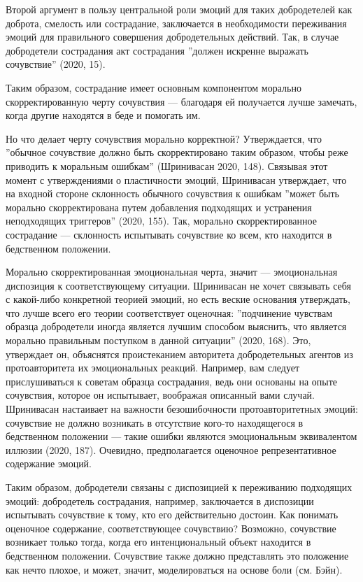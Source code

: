 \documentclass[11pt]{book}
\begin{document}
Второй аргумент в пользу центральной роли эмоций для таких добродетелей как доброта, смелость или сострадание, заключается в необходимости переживания эмоций для правильного совершения добродетельных действий. Так, в случае добродетели сострадания акт сострадания ''должен искренне выражать сочувствие'' (2020, 15).

Таким образом, сострадание имеет основным компонентом морально скорректированную черту сочувствия --- благодаря ей получается лучше замечать, когда другие находятся в беде и помогать им.

Но что делает черту сочувствия морально корректной? Утверждается, что ''обычное сочувствие должно быть скорректировано таким образом, чтобы реже приводить к моральным ошибкам'' (Шринивасан 2020, 148). Связывая этот момент с утверждениями о пластичности эмоций, Шринивасан утверждает, что на входной стороне склонность обычного сочувствия к ошибкам ''может быть морально скорректирована путем добавления подходящих и устранения неподходящих триггеров'' (2020, 155). Так, морально скорректированное сострадание --- склонность испытывать сочувствие ко всем, кто находится в бедственном положении.

Морально скорректированная эмоциональная черта, значит --- эмоциональная диспозиция к соответствующему ситуации. Шринивасан не хочет связывать себя с какой-либо конкретной теорией эмоций, но есть веские основания утверждать, что лучше всего его теории соответствует оценочная: ''подчинение чувствам образца добродетели иногда является лучшим способом выяснить, что является морально правильным поступком в данной ситуации'' (2020, 168). Это, утверждает он, объяснятся проистеканием авторитета добродетельных агентов из протоавторитета их эмоциональных реакций. Например, вам следует прислушиваться к советам образца сострадания, ведь они основаны на опыте сочувствия, которое он испытывает, воображая описанный вами случай. Шринивасан настаивает на важности безошибочности протоавторитетных эмоций: сочувствие не должно возникать в отсутствие кого-то находящегося в бедственном положении --- такие ошибки являются эмоциональным эквивалентом иллюзии (2020, 187). Очевидно, предполагается оценочное репрезентативное содержание эмоций.

Таким образом, добродетели связаны с диспозицией к переживанию подходящих эмоций: добродетель сострадания, например, заключается в диспозиции испытывать сочувствие к тому, кто его действительно достоин. Как понимать оценочное содержание, соответствующее сочувствию? Возможно, сочувствие возникает только тогда, когда его интенциональный объект находится в бедственном положении. Сочувствие также должно представлять это положение как нечто плохое, и может, значит, моделироваться на основе боли (см. Бэйн).
\end{document}
